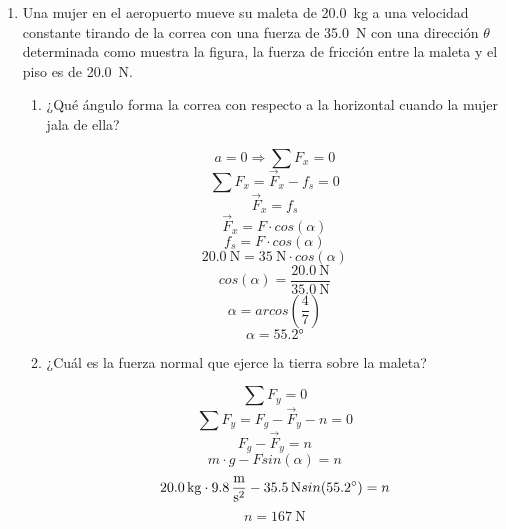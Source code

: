 \documentclass[../practica.root.tex]{subfiles}
\begin{document}
\begin{enumerate}
	\item
	      \begin{multicols}{2}
		      Una mujer en el aeropuerto mueve su maleta de \SI{20,0}{\kilogram} a una
		      velocidad constante tirando de la correa con una fuerza de \SI{35,0}{\newton} con
		      una dirección $\theta$ determinada como muestra la figura, la fuerza de
		      fricción entre la maleta y el piso es de \SI{20,0}{\newton}.
		      \begin{center}
		      \end{center}
	      \end{multicols}
	      \begin{enumerate}
		      \item ¿Qué ángulo forma la correa con respecto a la horizontal cuando la mujer jala de ella?
		            \begin{center}
			            \[ a = 0 \Rightarrow \sum F_x = 0 \]
			            \[ \sum F_x = \vec{F}_x - f_s = 0 \]
			            \[ \vec{F}_x = f_s \]
			            \[ \vec{F}_x = F\cdot cos(\alpha) \]
			            \[ f_s = F\cdot cos(\alpha) \]
			            \[ \SI{20,0}{\newton} = \SI{35}{\newton}\cdot cos(\alpha)\]
			            \[ cos(\alpha) = \frac{\SI{20,0}{\newton}}{\SI{35,0}{\newton}} \]
			            \[ \alpha = arcos(\frac{4}{7}) \]
			            \[ \boxed{\alpha = \ang{55,2}} \]
		            \end{center}
		      \item ¿Cuál es la fuerza normal que ejerce la tierra sobre la maleta?
		            \begin{center}
			            \[ \sum F_y = 0 \]
			            \[ \sum F_y = F_g - \vec{F}_y - n = 0 \]
			            \[ F_g - \vec{F}_y = n \]
			            \[ m\cdot g - Fsin(\alpha) = n \]
			            \[ \SI{20,0}{\kilogram}\cdot \gravity - \SI{35,5}{\newton}sin(\ang{55,2}) = n \]
			            \[ \boxed{n = \SI{167}{\newton}} \]
		            \end{center}
	      \end{enumerate}


\end{enumerate}
\end{document}
